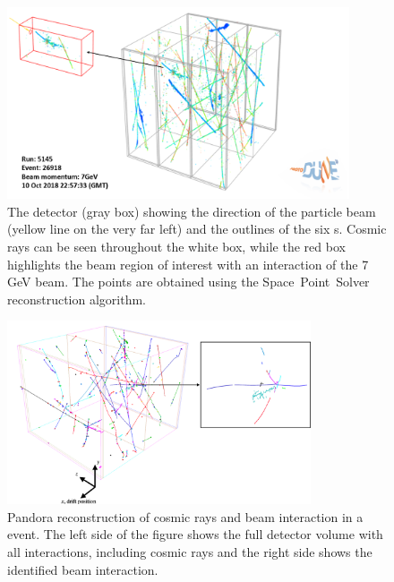 \begin{figure}
\centering
\includegraphics[width=0.9\textwidth]{graphics/IntroFigures/Fig_06_bee_event.png}
\caption {The  detector (gray box) showing 
the direction of the particle beam (yellow line on the very far left) and the outlines of the six s. Cosmic rays
can be seen throughout the white box, while the red box highlights the beam region of interest with an interaction of the 7 GeV beam. 
The \threed points are obtained using the Space~Point~Solver reconstruction algorithm. }
\label{wire-cell-bee}
\end{figure}

\begin{figure}
\centering
\includegraphics[width=0.8\textwidth]{graphics/IntroFigures/Fig_07_pandora.png}
\caption{Pandora  reconstruction of cosmic rays and beam interaction in a  event. The left side of the figure shows the full detector volume with all interactions, including cosmic rays and the right side shows the identified beam interaction.}
\label{pandora}
\end{figure}


